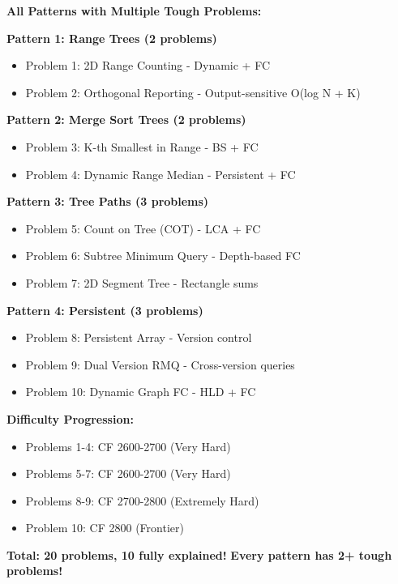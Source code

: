 \documentclass[11pt,a4paper,oneside]{book}
\begin{document}
\begin{tcolorbox}[
    enhanced,breakable,
    colback=primaryblue!10,
    colframe=primaryblue,
    boxrule=2pt,
    arc=4mm,
    title=\textbf{Fractional Cascading: Complete Mastery - 10+ Problems}
]
\textbf{All Patterns with Multiple Tough Problems:}

\textbf{Pattern 1: Range Trees (2 problems)}
\begin{itemize}
\item Problem 1: 2D Range Counting - Dynamic + FC
\item Problem 2: Orthogonal Reporting - Output-sensitive O(log N + K)
\end{itemize}

\textbf{Pattern 2: Merge Sort Trees (2 problems)}
\begin{itemize}
\item Problem 3: K-th Smallest in Range - BS + FC
\item Problem 4: Dynamic Range Median - Persistent + FC
\end{itemize}

\textbf{Pattern 3: Tree Paths (3 problems)}
\begin{itemize}
\item Problem 5: Count on Tree (COT) - LCA + FC
\item Problem 6: Subtree Minimum Query - Depth-based FC
\item Problem 7: 2D Segment Tree - Rectangle sums
\end{itemize}

\textbf{Pattern 4: Persistent (3 problems)}
\begin{itemize}
\item Problem 8: Persistent Array - Version control
\item Problem 9: Dual Version RMQ - Cross-version queries
\item Problem 10: Dynamic Graph FC - HLD + FC
\end{itemize}

\textbf{Difficulty Progression:}
\begin{itemize}
\item Problems 1-4: CF 2600-2700 (Very Hard)
\item Problems 5-7: CF 2600-2700 (Very Hard)
\item Problems 8-9: CF 2700-2800 (Extremely Hard)
\item Problem 10: CF 2800 (Frontier)
\end{itemize}

\textbf{Total: 20 problems, 10 fully explained!}
\textbf{Every pattern has 2+ tough problems!}
\end{tcolorbox}
\end{document}
